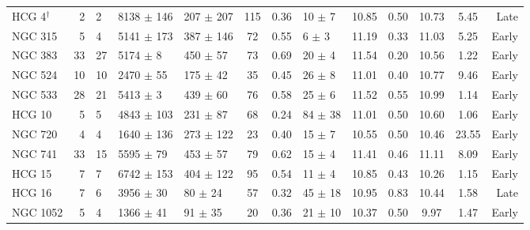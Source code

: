\begin{table*}
\begin{center}
\begin{tabular}{@{}lr@{\hspace{0.1cm}}lllccl@{\hspace{0.2cm}}ccc@{\hspace{0.2cm}}c@{\hspace{0.2cm}}r@{}}
HCG 4$^{\dagger}$     &  2   &  2                     &  8138 $\pm$ 146  &  207 $\pm$ 207  &  115       &  0.36      &  10   $\pm$ 7   &  10.85          &  0.50  &  10.73          &  5.45   &  Late     \\
NGC 315               &  5   &  4                     &  5141 $\pm$ 173  &  387 $\pm$ 146  &  72        &  0.55      &  6    $\pm$ 3   &  11.19          &  0.33  &  11.03          &  5.25   &  Early    \\
NGC 383               &  33  &  27                    &  5174 $\pm$ 8    &  450 $\pm$ 57   &  73        &  0.69      &  20   $\pm$ 4   &  11.54          &  0.20  &  10.56          &  1.22   &  Early    \\
NGC 524               &  10  &  10                    &  2470 $\pm$ 55   &  175 $\pm$ 42   &  35        &  0.45      &  26   $\pm$ 8   &  11.01          &  0.40  &  10.77          &  9.46   &  Early    \\
NGC 533               &  28  &  21                    &  5413 $\pm$ 3    &  439 $\pm$ 60   &  76        &  0.58      &  25   $\pm$ 6   &  11.52          &  0.55  &  10.99          &  1.14   &  Early    \\
HCG 10                &  5   &  5                     &  4843 $\pm$ 103  &  231 $\pm$ 87   &  68        &  0.24      &  84   $\pm$ 38  &  11.01          &  0.50  &  10.60          &  1.06   &  Early    \\
NGC 720               &  4   &  4                     &  1640 $\pm$ 136  &  273 $\pm$ 122  &  23        &  0.40      &  15   $\pm$ 7   &  10.55          &  0.50  &  10.46          &  23.55  &  Early    \\
NGC 741               &  33  &  15                    &  5595 $\pm$ 79   &  453 $\pm$ 57   &  79        &  0.62      &  15   $\pm$ 4   &  11.41          &  0.46  &  11.11          &  8.09   &  Early    \\
HCG 15                &  7   &  7                     &  6742 $\pm$ 153  &  404 $\pm$ 122  &  95        &  0.54      &  11   $\pm$ 4   &  10.85          &  0.43  &  10.26          &  1.15   &  Early    \\
HCG 16                &  7   &  6                     &  3956 $\pm$ 30   &  80  $\pm$ 24   &  57        &  0.32      &  45   $\pm$ 18  &  10.95          &  0.83  &  10.44          &  1.58   &  Late     \\
NGC 1052              &  5   &  4                     &  1366 $\pm$ 41   &  91  $\pm$ 35   &  20        &  0.36      &  21   $\pm$ 10  &  10.37          &  0.50  &  9.97           &  1.47   &  Early    \\

\end{tabular}
\end{center}
\end{table*}
